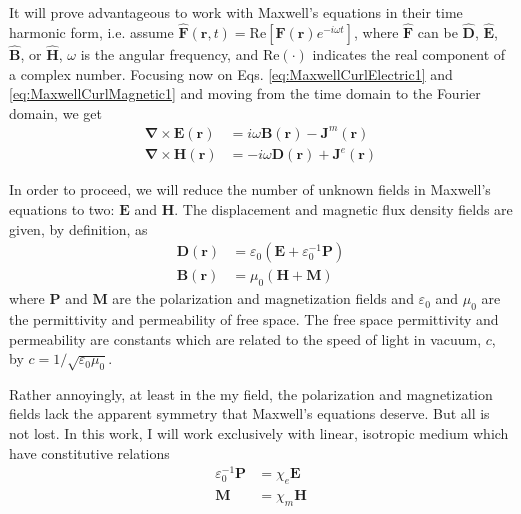 It will prove advantageous to work with Maxwell's equations in their time harmonic form, i.e. assume $\widehat{\boldsymbol{F}}(\boldsymbol{r}, t) = \mathrm{Re}[{\boldsymbol{F}}(\boldsymbol{r}) e^{-i \omega t}]$, where $\widehat{\boldsymbol{F}}$ can be $\widehat{\boldsymbol{D}}$, $\widehat{\boldsymbol{E}}$, $\widehat{\boldsymbol{B}}$, or $\widehat{\boldsymbol{H}}$, $\omega$ is the angular frequency, and $\mathrm{Re}(\cdot)$ indicates the real component of a complex number. Focusing now on Eqs. \ref {eq:MaxwellCurlElectric1} and \ref {eq:MaxwellCurlMagnetic1} and moving from the time domain to the Fourier domain, we get
%
\begin{subequations}
\begin{align}
\boldsymbol{\nabla} \times \boldsymbol{E}(\boldsymbol{r}) &= i \omega \boldsymbol{B}(\boldsymbol{r}) - \boldsymbol{J}^m(\boldsymbol{r}) \label{eq:MaxwellCurlElectric2}
\\
\boldsymbol{\nabla} \times \boldsymbol{H}(\boldsymbol{r}) &= - i \omega \boldsymbol{D}(\boldsymbol{r}) + \boldsymbol{J}^e(\boldsymbol{r}) \label{eq:MaxwellCurlMagnetic2}
\end{align}
\end{subequations}

In order to proceed, we will reduce the number of unknown fields in Maxwell's equations to two: $\boldsymbol{E}$ and $\boldsymbol{H}$. The displacement and magnetic flux density fields are given, by definition, as
%
\begin{subequations}
\begin{align}
\boldsymbol{D}(\boldsymbol{r}) &= \varepsilon_{0} \left( \boldsymbol{E} + \varepsilon_{0}^{-1} \boldsymbol{P} \right)
\\
\boldsymbol{B}(\boldsymbol{r}) &= \mu_{0} \left( \boldsymbol{H} + \boldsymbol{M} \right)
\end{align}
\end{subequations}
%
where $\boldsymbol{P}$ and $\boldsymbol{M}$ are the polarization and magnetization fields and $\varepsilon_{0}$ and $\mu_{0}$ are the permittivity and permeability of free space. The free space permittivity and permeability are constants which are related to the speed of light in vacuum, $c$, by $c = 1/\sqrt{\varepsilon_{0} \mu_{0}}$.

Rather annoyingly, at least in the my field, the polarization and magnetization fields lack the apparent symmetry that Maxwell's equations deserve. But all is not lost. In this work, I will work exclusively with linear, isotropic medium which have constitutive relations 
%
\begin{subequations}
\begin{align}
\varepsilon_{0}^{-1} \boldsymbol{P} &= \chi_{e} \boldsymbol{E} \label{eq:Polarization}
\\
\boldsymbol{M} &= \chi_{m} \boldsymbol{H}
\end{align}
\end{subequations}


